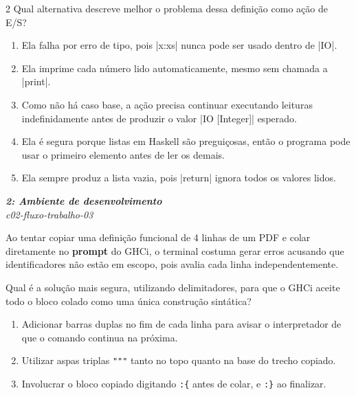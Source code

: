 \documentclass[a4paper,10pt,brazil]{article}
\begin{document}
\begin{multicols}{2}
Qual alternativa descreve melhor o problema dessa definição como ação de E/S?

\begin{enumerate}
  \item Ela falha por erro de tipo, pois \haskellinline|x:xs| nunca pode ser usado dentro de \haskellinline|IO|.

  \item Ela imprime cada número lido automaticamente, mesmo sem chamada a \haskellinline|print|.

  \item Como não há caso base, a ação precisa continuar executando leituras indefinidamente antes de produzir o valor \haskellinline|IO [Integer]| esperado.

  \item Ela é segura porque listas em Haskell são preguiçosas, então o programa pode usar o primeiro elemento antes de ler os demais.

  \item Ela sempre produz a lista vazia, pois \haskellinline|return| ignora todos os valores lidos.


\end{enumerate}

\begin{flushright}
  \footnotesize
  \textit{\textbf{2: Ambiente de desenvolvimento}}\\
  \textit{c02-fluxo-trabalho-03}\\

\end{flushright}
Ao tentar copiar uma definição funcional de 4 linhas de um PDF e colar diretamente no \textbf{prompt} do GHCi, o terminal costuma gerar erros acusando que identificadores não estão em escopo, pois avalia cada linha independentemente. 

Qual é a solução mais segura, utilizando delimitadores, para que o GHCi aceite todo o bloco colado como uma única construção sintática?

\begin{enumerate}
  \item Adicionar barras duplas \haskellinline{//} no fim de cada linha para avisar o interpretador de que o comando continua na próxima.

  \item Utilizar aspas triplas \texttt{"""} tanto no topo quanto na base do trecho copiado.

  \item Involucrar o bloco copiado digitando \texttt{:\{} antes de colar, e \texttt{:\}} ao finalizar.


\end{enumerate}
\end{multicols}
\end{document}
